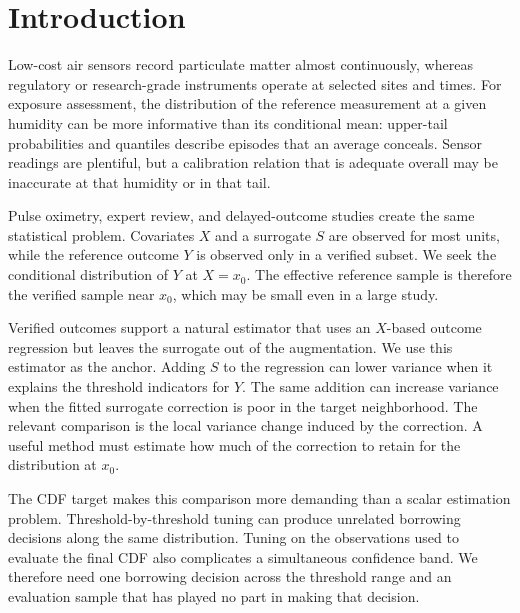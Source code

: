 \section{Introduction}
\label{sec:introduction}

Low-cost air sensors record particulate matter almost continuously, whereas
regulatory or research-grade instruments operate at selected sites and times.
For exposure assessment, the distribution of the reference measurement at a
given humidity can be more informative than its conditional mean: upper-tail
probabilities and quantiles describe episodes that an average conceals. Sensor
readings are plentiful, but a calibration relation that is adequate overall
may be inaccurate at that humidity or in that tail.

Pulse oximetry, expert review, and delayed-outcome studies create the same
statistical problem. Covariates \(X\) and a surrogate \(S\) are observed for
most units, while the reference outcome \(Y\) is observed only in a verified
subset. We seek the conditional distribution of \(Y\) at \(X=x_0\). The
effective reference sample is therefore the verified sample near \(x_0\),
which may be small even in a large study.

Verified outcomes support a natural estimator that uses an \(X\)-based outcome
regression but leaves the surrogate out of the augmentation. We use this
estimator as the anchor. Adding \(S\) to the regression can lower variance when
it explains the threshold indicators for \(Y\). The same addition can increase
variance when the fitted surrogate correction is poor in the target
neighborhood. The relevant comparison is the local variance change induced by
the correction. A useful method must estimate how much of the correction to
retain for the distribution at \(x_0\).

The CDF target makes this comparison more demanding than a scalar estimation
problem. Threshold-by-threshold tuning can produce unrelated borrowing
decisions along the same distribution. Tuning on the observations used to
evaluate the final CDF also complicates a simultaneous confidence band. We
therefore need one borrowing decision across the threshold range and an
evaluation sample that has played no part in making that decision.

